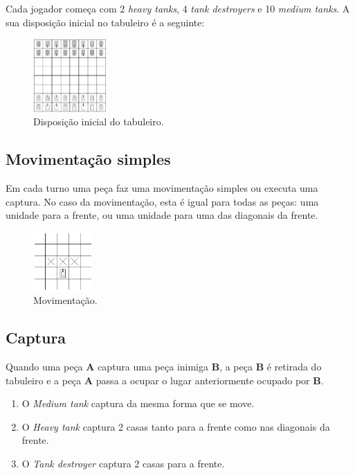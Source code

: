 \documentclass[a4paper,11pt,portuguese]{article}
\begin{document}
\noindent Cada jogador começa com 2 \textit{heavy tanks}, 4 \textit{tank destroyers}
e 10 \textit{medium tanks}. A sua disposição inicial no tabuleiro é a seguinte:

\begin{figure}[H]
    \centering
    \includegraphics[width=0.25\textwidth]{imgs/board.png}
    \caption{Disposição inicial do tabuleiro.}
    \label{fig:board}
\end{figure}

\subsection{Movimentação simples}
Em cada turno uma peça faz uma movimentação simples ou executa uma captura. No caso 
da movimentação, esta é igual para todas as peças: uma unidade para a frente, ou uma 
unidade para uma das diagonais da frente.

\begin{figure}[H]
    \centering
    \includegraphics[width=0.2\textwidth]{imgs/movement.png}
    \caption{Movimentação.}
    \label{fig:movemente}
\end{figure}

\subsection{Captura}
Quando uma peça \textbf{A} captura uma peça inimiga \textbf{B}, a peça \textbf{B} é retirada do tabuleiro
e a peça \textbf{A} passa a ocupar o lugar anteriormente ocupado por \textbf{B}. 

\begin{enumerate}[topsep=4pt,itemsep=2pt]
    \item O \textit{Medium tank} captura da mesma forma que se move.
    \item O \textit{Heavy tank} captura 2 casas tanto para a frente 
    como nas diagonais da frente.
    \item O \textit{Tank destroyer} captura 2 casas para a frente.
\end{enumerate}
\end{document}
